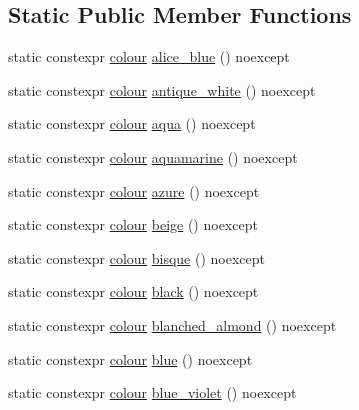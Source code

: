 \subsection*{Static Public Member Functions}
\begin{DoxyCompactItemize}
\item 
static constexpr \mbox{\hyperlink{classmoka_1_1colour}{colour}} \mbox{\hyperlink{classmoka_1_1colour_af1c552c481818c9378f5abeb2214889b}{alice\+\_\+blue}} () noexcept
\item 
static constexpr \mbox{\hyperlink{classmoka_1_1colour}{colour}} \mbox{\hyperlink{classmoka_1_1colour_a532d207410adfcd06b0f451ac95c666c}{antique\+\_\+white}} () noexcept
\item 
static constexpr \mbox{\hyperlink{classmoka_1_1colour}{colour}} \mbox{\hyperlink{classmoka_1_1colour_a4e2f27f7832857daeef115f66549e6bb}{aqua}} () noexcept
\item 
static constexpr \mbox{\hyperlink{classmoka_1_1colour}{colour}} \mbox{\hyperlink{classmoka_1_1colour_aee9c426d760827fc9f707ff40b8b84db}{aquamarine}} () noexcept
\item 
static constexpr \mbox{\hyperlink{classmoka_1_1colour}{colour}} \mbox{\hyperlink{classmoka_1_1colour_a185e9a1f0990b11ca59fd8040b3c3559}{azure}} () noexcept
\item 
static constexpr \mbox{\hyperlink{classmoka_1_1colour}{colour}} \mbox{\hyperlink{classmoka_1_1colour_afb2ce945acaca00e4fbfdfaafbf93133}{beige}} () noexcept
\item 
static constexpr \mbox{\hyperlink{classmoka_1_1colour}{colour}} \mbox{\hyperlink{classmoka_1_1colour_adfb3cf8ca44c804f0bec28a94917d125}{bisque}} () noexcept
\item 
static constexpr \mbox{\hyperlink{classmoka_1_1colour}{colour}} \mbox{\hyperlink{classmoka_1_1colour_a9a13c40cfd103597ad9fe270e6eedc99}{black}} () noexcept
\item 
static constexpr \mbox{\hyperlink{classmoka_1_1colour}{colour}} \mbox{\hyperlink{classmoka_1_1colour_a6d76417a9430cf492b4288fdcee2b6d0}{blanched\+\_\+almond}} () noexcept
\item 
static constexpr \mbox{\hyperlink{classmoka_1_1colour}{colour}} \mbox{\hyperlink{classmoka_1_1colour_a38dd73ca19580132063e3a2c1e4862bf}{blue}} () noexcept
\item 
static constexpr \mbox{\hyperlink{classmoka_1_1colour}{colour}} \mbox{\hyperlink{classmoka_1_1colour_a95909c5c6b37b9147c4667d83341060c}{blue\+\_\+violet}} () noexcept
\item 

\end{DoxyCompactItemize}
